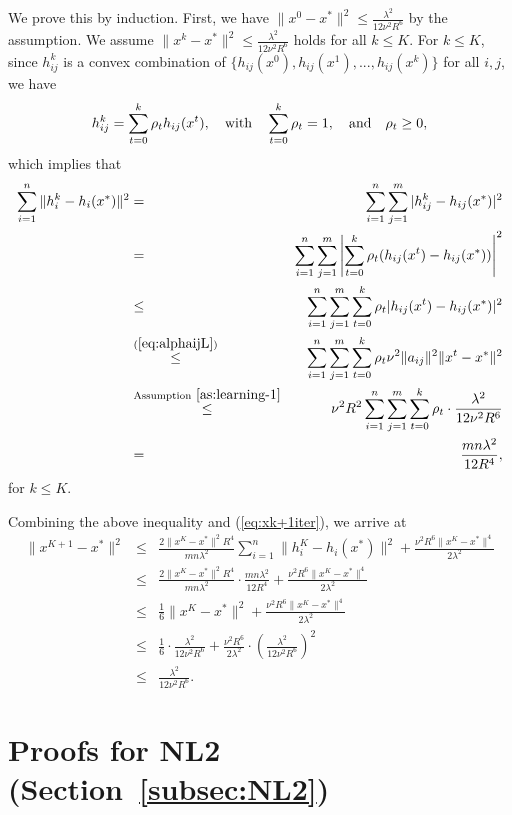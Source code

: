 \documentclass[12pt]{article}
\newcommand{\newalpha}{h}
\begin{document}
We prove this by induction. First, we have $\|x^0 - x^*\|^2 \leq \frac{\lambda^2}{12\nu^2R^6}$ by the assumption. We assume $\|x^k - x^*\|^2 \leq \frac{\lambda^2}{12\nu^2R^6}$ holds for all $k \leq K$. For $k\leq K$, since $h_{ij}^k$ is a convex combination of $\{  \newalpha_{ij}(x^0), \newalpha_{ij}(x^1), ..., \newalpha_{ij}(x^k)  \}$ for all $i,j$, we have 
$$
h_{ij}^k = \sum_{t=0}^k \rho_t \newalpha_{ij}(x^t), \quad {\rm with}\quad  \sum_{t=0}^k\rho_t = 1, \quad {\rm and} \quad \rho_t \geq 0, 
$$
which implies that 
\begin{eqnarray*}
	\sum_{i=1}^n\|h_i^k - \newalpha_i(x^*)\|^2 &=& \sum_{i=1}^n \sum_{j=1}^m |h_{ij}^k - \newalpha_{ij}(x^*)|^2 \\
	&=&  \sum_{i=1}^n \sum_{j=1}^m \left|  \sum_{t=0}^k \rho_t (\newalpha_{ij}(x^t) - \newalpha_{ij}(x^*))  \right|^2 \\ 
	&\leq&  \sum_{i=1}^n \sum_{j=1}^m  \sum_{t=0}^k \rho_t | \newalpha_{ij}(x^t) - \newalpha_{ij}(x^*) |^2 \\ 
	&\overset{(\ref{eq:alphaijL})}{\leq}&  \sum_{i=1}^n \sum_{j=1}^m  \sum_{t=0}^k \rho_t \nu^2 \|a_{ij}\|^2 \|x^t - x^*\|^2 \\ 
	&\overset{\text{Assumption}~\ref{as:learning-1}}{\leq}& \nu^2 R^2 \sum_{i=1}^n \sum_{j=1}^m  \sum_{t=0}^k \rho_t \cdot \frac{\lambda^2}{12\nu^2R^6} \\
	&=& \frac{mn \lambda^2}{12R^4}, 
\end{eqnarray*}
for $k\leq K$. 

Combining the above inequality and (\ref{eq:xk+1iter}), we arrive at 
\begin{eqnarray*}
	\|x^{K+1} - x^*\|^2 &\leq& \frac{2\|x^K-x^*\|^2 R^4}{mn\lambda^2} \sum_{i=1}^n \|h_i^K - \newalpha_i(x^*)\|^2 + \frac{ \nu^2 R^6\|x^K-x^*\|^4}{2\lambda^2} \\
	&\leq&  \frac{2\|x^K-x^*\|^2 R^4}{mn\lambda^2} \cdot  \frac{mn \lambda^2}{12R^4} +  \frac{ \nu^2 R^6\|x^K-x^*\|^4}{2\lambda^2} \\
	&\leq& \frac{1}{6}\|x^K - x^*\|^2 +  \frac{ \nu^2 R^6\|x^K-x^*\|^4}{2\lambda^2} \\
	&\leq& \frac{1}{6} \cdot \frac{\lambda^2}{12\nu^2R^6} + \frac{ \nu^2 R^6}{2\lambda^2} \cdot \left(\frac{\lambda^2}{12\nu^2R^6} \right)^2 \\ 
	&\leq& \frac{\lambda^2}{12\nu^2R^6}. 
\end{eqnarray*}





\clearpage
\section{Proofs for {\sf NL2} (Section~\ref{subsec:NL2})}
 
\end{document}
